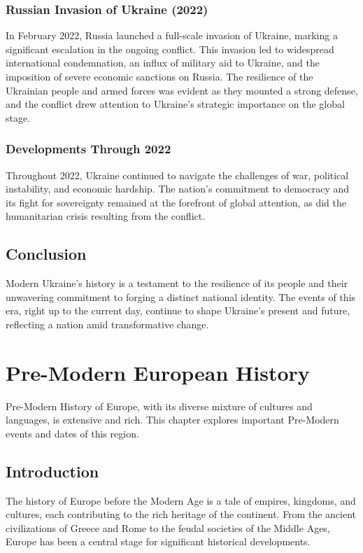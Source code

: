 \documentclass{book}
\begin{document}
\subsection{Russian Invasion of Ukraine (2022)}
In February 2022, Russia launched a full-scale invasion of Ukraine, marking a significant escalation in the ongoing conflict. This invasion led to widespread international condemnation, an influx of military aid to Ukraine, and the imposition of severe economic sanctions on Russia. The resilience of the Ukrainian people and armed forces was evident as they mounted a strong defense, and the conflict drew attention to Ukraine's strategic importance on the global stage.

\subsection{Developments Through 2022}
Throughout 2022, Ukraine continued to navigate the challenges of war, political instability, and economic hardship. The nation’s commitment to democracy and its fight for sovereignty remained at the forefront of global attention, as did the humanitarian crisis resulting from the conflict.

\section{Conclusion}
\label{sec:conclusion-modern-ukraine}
Modern Ukraine’s history is a testament to the resilience of its people and their unwavering commitment to forging a distinct national identity. The events of this era, right up to the current day, continue to shape Ukraine's present and future, reflecting a nation amid transformative change.

\chapter{Pre-Modern European History}
\label{ch:pre-modern-european-history}

Pre-Modern History of Europe, with its diverse mixture of cultures and languages, is extensive and rich. This chapter explores important Pre-Modern events and dates of this region.

\section{Introduction}
\label{sec:introduction-pre-modern-europe}
The history of Europe before the Modern Age is a tale of empires, kingdoms, and cultures, each contributing to the rich heritage of the continent. From the ancient civilizations of Greece and Rome to the feudal societies of the Middle Ages, Europe has been a central stage for significant historical developments.
\end{document}

